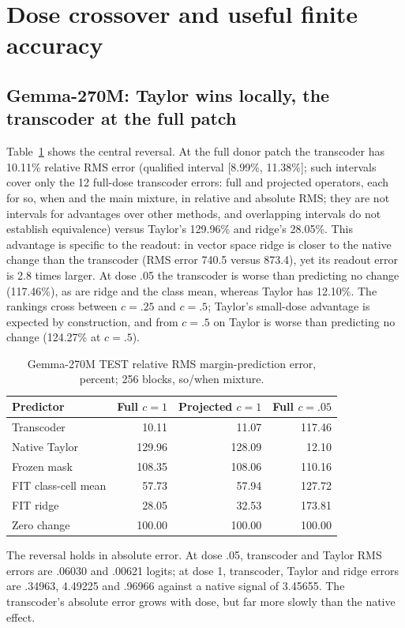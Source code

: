 \documentclass[11pt]{article}
\begin{document}
\section{Dose crossover and useful finite accuracy}
\subsection{Gemma-270M: Taylor wins locally, the transcoder at the full patch}
Table~\ref{tab:main} shows the central reversal. At the full donor patch the transcoder has 10.11\% relative RMS error (qualified interval [8.99\%, 11.38\%]; such intervals cover only the 12 full-dose transcoder errors: full and projected operators, each for so, when and the main mixture, in relative and absolute RMS; they are not intervals for advantages over other methods, and overlapping intervals do not establish equivalence) versus Taylor's 129.96\% and ridge's 28.05\%. This advantage is specific to the readout: in vector space ridge is closer to the native change than the transcoder (RMS error 740.5 versus 873.4), yet its readout error is 2.8 times larger. At dose .05 the transcoder is worse than predicting no change (117.46\%), as are ridge and the class mean, whereas Taylor has 12.10\%. The rankings cross between $c=.25$ and $c=.5$; Taylor's small-dose advantage is expected by construction, and from $c=.5$ on Taylor is worse than predicting no change (124.27\% at $c=.5$).

\begin{table}[ht]\centering\small
\begin{tabular}{lrrr}\toprule Predictor & Full $c=1$ & Projected $c=1$ & Full $c=.05$\\\midrule
Transcoder & 10.11 & 11.07 & 117.46\\
Native Taylor & 129.96 & 128.09 & 12.10\\
Frozen mask & 108.35 & 108.06 & 110.16\\
FIT class-cell mean & 57.73 & 57.94 & 127.72\\
FIT ridge & 28.05 & 32.53 & 173.81\\
Zero change & 100.00 & 100.00 & 100.00\\\bottomrule\end{tabular}
\caption{Gemma-270M TEST relative RMS margin-prediction error, percent; 256 blocks, so/when mixture.}\label{tab:main}
\end{table}

The reversal holds in absolute error. At dose .05, transcoder and Taylor RMS errors are .06030 and .00621 logits; at dose 1, transcoder, Taylor and ridge errors are .34963, 4.49225 and .96966 against a native signal of 3.45655. The transcoder's absolute error grows with dose, but far more slowly than the native effect.
\end{document}
